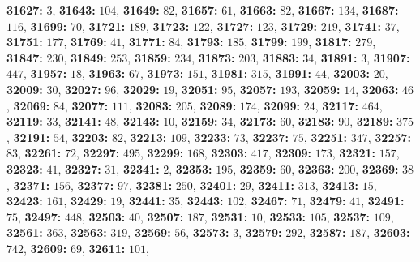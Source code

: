 \textsf{\bfseries 31627:} $3$, \textsf{\bfseries 31643:} $104$, \textsf{\bfseries 31649:} $82$, \textsf{\bfseries 31657:} $61$, \textsf{\bfseries 31663:} $82$, \textsf{\bfseries 31667:} $134$, \textsf{\bfseries 31687:} $116$, \textsf{\bfseries 31699:} $70$, \textsf{\bfseries 31721:} $189$, \textsf{\bfseries 31723:} $122$, \textsf{\bfseries 31727:} $123$, \textsf{\bfseries 31729:} $219$, \textsf{\bfseries 31741:} $37$, \textsf{\bfseries 31751:} $177$, \textsf{\bfseries 31769:} $41$, \textsf{\bfseries 31771:} $84$, \textsf{\bfseries 31793:} $185$, \textsf{\bfseries 31799:} $199$, \textsf{\bfseries 31817:} $279$, \textsf{\bfseries 31847:} $230$, \textsf{\bfseries 31849:} $253$, \textsf{\bfseries 31859:} $234$, \textsf{\bfseries 31873:} $203$, \textsf{\bfseries 31883:} $34$, \textsf{\bfseries 31891:} $3$, \textsf{\bfseries 31907:} $447$, \textsf{\bfseries 31957:} $18$, \textsf{\bfseries 31963:} $67$, \textsf{\bfseries 31973:} $151$, \textsf{\bfseries 31981:} $315$, \textsf{\bfseries 31991:} $44$, \textsf{\bfseries 32003:} $20$, \textsf{\bfseries 32009:} $30$, \textsf{\bfseries 32027:} $96$, \textsf{\bfseries 32029:} $19$, \textsf{\bfseries 32051:} $95$, \textsf{\bfseries 32057:} $193$, \textsf{\bfseries 32059:} $14$, \textsf{\bfseries 32063:} $46$, \textsf{\bfseries 32069:} $84$, \textsf{\bfseries 32077:} $111$, \textsf{\bfseries 32083:} $205$, \textsf{\bfseries 32089:} $174$, \textsf{\bfseries 32099:} $24$, \textsf{\bfseries 32117:} $464$, \textsf{\bfseries 32119:} $33$, \textsf{\bfseries 32141:} $48$, \textsf{\bfseries 32143:} $10$, \textsf{\bfseries 32159:} $34$, \textsf{\bfseries 32173:} $60$, \textsf{\bfseries 32183:} $90$, \textsf{\bfseries 32189:} $375$, \textsf{\bfseries 32191:} $54$, \textsf{\bfseries 32203:} $82$, \textsf{\bfseries 32213:} $109$, \textsf{\bfseries 32233:} $73$, \textsf{\bfseries 32237:} $75$, \textsf{\bfseries 32251:} $347$, \textsf{\bfseries 32257:} $83$, \textsf{\bfseries 32261:} $72$, \textsf{\bfseries 32297:} $495$, \textsf{\bfseries 32299:} $168$, \textsf{\bfseries 32303:} $417$, \textsf{\bfseries 32309:} $173$, \textsf{\bfseries 32321:} $157$, \textsf{\bfseries 32323:} $41$, \textsf{\bfseries 32327:} $31$, \textsf{\bfseries 32341:} $2$, \textsf{\bfseries 32353:} $195$, \textsf{\bfseries 32359:} $60$, \textsf{\bfseries 32363:} $200$, \textsf{\bfseries 32369:} $38$, \textsf{\bfseries 32371:} $156$, \textsf{\bfseries 32377:} $97$, \textsf{\bfseries 32381:} $250$, \textsf{\bfseries 32401:} $29$, \textsf{\bfseries 32411:} $313$, \textsf{\bfseries 32413:} $15$, \textsf{\bfseries 32423:} $161$, \textsf{\bfseries 32429:} $19$, \textsf{\bfseries 32441:} $35$, \textsf{\bfseries 32443:} $102$, \textsf{\bfseries 32467:} $71$, \textsf{\bfseries 32479:} $41$, \textsf{\bfseries 32491:} $75$, \textsf{\bfseries 32497:} $448$, \textsf{\bfseries 32503:} $40$, \textsf{\bfseries 32507:} $187$, \textsf{\bfseries 32531:} $10$, \textsf{\bfseries 32533:} $105$, \textsf{\bfseries 32537:} $109$, \textsf{\bfseries 32561:} $363$, \textsf{\bfseries 32563:} $319$, \textsf{\bfseries 32569:} $56$, \textsf{\bfseries 32573:} $3$, \textsf{\bfseries 32579:} $292$, \textsf{\bfseries 32587:} $187$, \textsf{\bfseries 32603:} $742$, \textsf{\bfseries 32609:} $69$, \textsf{\bfseries 32611:} $101$, 
